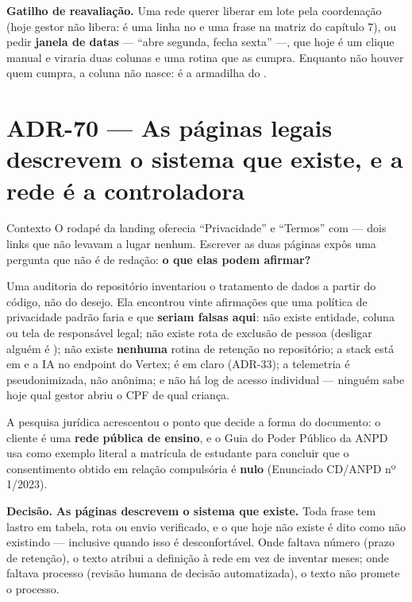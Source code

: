 \textbf{Gatilho de reavaliação.} Uma rede querer liberar em lote pela
coordenação (hoje gestor não libera: é uma linha no  e uma frase na
matriz do capítulo 7), ou pedir \textbf{janela de datas} --- \enquote{abre
segunda, fecha sexta} ---, que hoje é um clique manual e viraria duas colunas e
uma rotina que as cumpra. Enquanto não houver quem cumpra, a coluna não nasce:
é a armadilha do .

\section{ADR-70 --- As páginas legais descrevem o sistema que existe, e a rede é
a controladora}
\label{adr:paginas-legais}

\begin{especificacao}{Contexto}
O rodapé da landing oferecia \enquote{Privacidade} e \enquote{Termos} com
 --- dois links que não levavam a lugar nenhum. Escrever as duas
páginas expôs uma pergunta que não é de redação: \textbf{o que elas podem
afirmar?}

Uma auditoria do repositório inventariou o tratamento de dados a partir do
código, não do desejo. Ela encontrou vinte afirmações que uma política de
privacidade padrão faria e que \textbf{seriam falsas aqui}: não existe entidade,
coluna ou tela de responsável legal; não existe rota de exclusão de pessoa
(desligar alguém é ); não existe \textbf{nenhuma} rotina de
retenção no repositório; a stack está em  e a IA no endpoint
 do Vertex;  é  em claro (ADR-33); a
telemetria é pseudonimizada, não anônima; e não há log de acesso individual ---
ninguém sabe hoje qual gestor abriu o CPF de qual criança.

A pesquisa jurídica acrescentou o ponto que decide a forma do documento: o
cliente é uma \textbf{rede pública de ensino}, e o Guia do Poder Público da ANPD
usa como exemplo literal a matrícula de estudante para concluir que o
consentimento obtido em relação compulsória é \textbf{nulo} (Enunciado CD/ANPD
nº 1/2023).
\end{especificacao}

\textbf{Decisão.} \textbf{As páginas descrevem o sistema que existe.} Toda frase
tem lastro em tabela, rota ou envio verificado, e o que hoje não existe é dito
como não existindo --- inclusive quando isso é desconfortável. Onde faltava
número (prazo de retenção), o texto atribui a definição à rede em vez de
inventar meses; onde faltava processo (revisão humana de decisão automatizada),
o texto não promete o processo.

